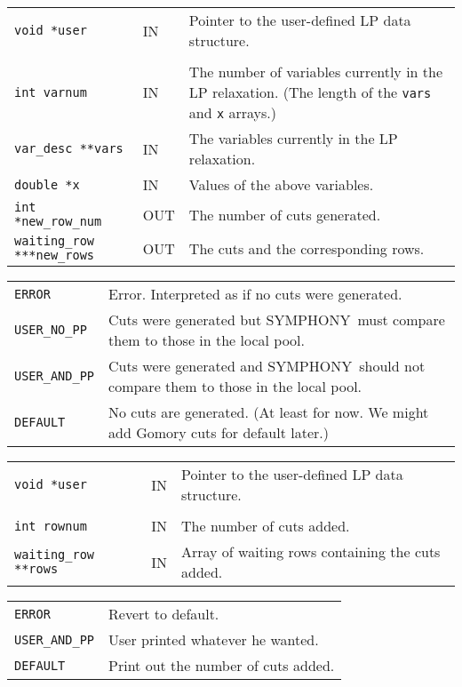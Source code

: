 \documentclass[twoside,11pt]{article}
\begin{document}
{\newpage
\clearpage
\samepage \begin{tabular}{llp{257.334pt}}
{\tt void *user} &  IN & Pointer to the user-defined LP data structure. \\ 
& & \\ 
{\tt int varnum} & IN & The number of variables currently in the LP
relaxation. (The length of the {\tt *vars} and {\tt x} arrays.) \\ 
{\tt var\_desc **vars} & IN & The variables currently in the LP relaxation.\\ 
{\tt double *x} & IN & Values of the above variables.\\ 
{\tt int *new\_row\_num} & OUT & The number of cuts generated. \\ 
{\tt waiting\_row ***new\_rows} & OUT & The cuts and the corresponding rows. \\ 
\end{tabular}
}

{\newpage
\clearpage
\samepage \begin{tabular}{lp{365.945pt}}
{\tt ERROR} & Error. Interpreted as if no cuts were generated. \\ 
{\tt USER\_NO\_PP} & Cuts were generated but {\sc SYMPHONY}\ must compare them to those
in the local pool. \\ 
{\tt USER\_AND\_PP} & Cuts were generated and {\sc SYMPHONY}\ should not compare them to
those in the local pool. \\ 
{\tt DEFAULT} & No cuts are generated. (At least for now. We might add Gomory
cuts for default later.) \\ 
\end{tabular}
}

{\newpage
\clearpage
\samepage \begin{tabular}{llp{282.115pt}}
{\tt void *user} &  IN & Pointer to the user-defined LP data structure. \\ 
& & \\ 
{\tt int rownum} & IN & The number of cuts added. \\ 
{\tt waiting\_row **rows} & IN & Array of waiting rows containing the
cuts added. \\ 
\end{tabular}
}

{\newpage
\clearpage
\samepage \begin{tabular}{lp{365.945pt}}
{\tt ERROR} & Revert to default. \\ 
{\tt USER\_AND\_PP} & User printed whatever he wanted. \\ 
{\tt DEFAULT} & Print out the number of cuts added. \\ 
\end{tabular}
}
\end{document}
